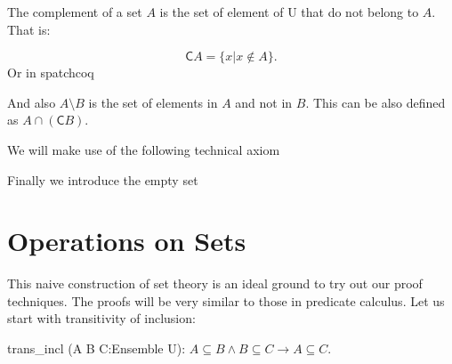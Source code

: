 The complement of a set $A$ is the set of element of U that do not belong to $A$. That is:

$$\mathsf{C} A =\{x | x \not\in A\}.$$
Or in spatchcoq

And also $A\setminus B$ is the set of elements in $A$ and not in $B$. This can be also defined as $A\cap (\mathsf{C} B)$.


We will make use of the following technical axiom

Finally we introduce the empty set
\section{Operations on Sets}\label{subset:operations}
This naive construction of set theory is an ideal ground  to try out our proof techniques. The proofs will be very similar to those in predicate calculus. Let us start with transitivity of inclusion:

\begin{lemma}
trans\_incl (A B C:Ensemble U): $A\subseteq B \land B \subseteq C \rightarrow A \subseteq C$.
\end{lemma}

